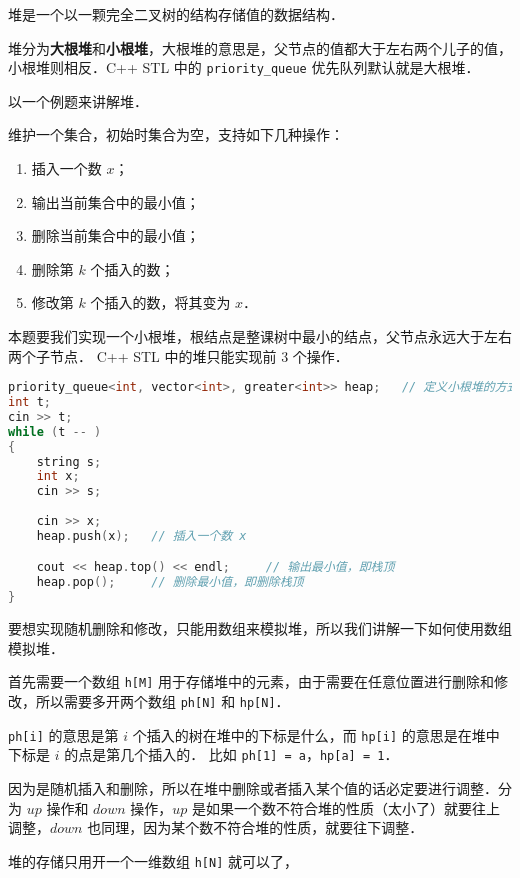 
堆是一个以一颗完全二叉树的结构存储值的数据结构．

堆分为\textbf{大根堆}和\textbf{小根堆}，大根堆的意思是，父节点的值都大于左右两个儿子的值，小根堆则相反．C++ STL 中的 \verb|priority_queue| 优先队列默认就是大根堆．

以一个例题来讲解堆．

维护一个集合，初始时集合为空，支持如下几种操作：
\begin{enumerate}
\item 插入一个数 $x$；
\item 输出当前集合中的最小值；
\item 删除当前集合中的最小值；
\item 删除第 $k$ 个插入的数；
\item 修改第 $k$ 个插入的数，将其变为 $x$．
\end{enumerate}

本题要我们实现一个小根堆，根结点是整课树中最小的结点，父节点永远大于左右两个子节点．
C++ STL 中的堆只能实现前 $3$ 个操作．
\begin{lstlisting}[language=cpp]
priority_queue<int, vector<int>, greater<int>> heap;   // 定义小根堆的方式
int t;
cin >> t;
while (t -- )
{
    string s;
    int x;
    cin >> s;
            
    cin >> x;
    heap.push(x);   // 插入一个数 x

    cout << heap.top() << endl;     // 输出最小值，即栈顶
    heap.pop();     // 删除最小值，即删除栈顶
}
\end{lstlisting}

要想实现随机删除和修改，只能用数组来模拟堆，所以我们讲解一下如何使用数组模拟堆．

首先需要一个数组 \verb|h[M]| 用于存储堆中的元素，由于需要在任意位置进行删除和修改，所以需要多开两个数组 \verb|ph[N]| 和 \verb|hp[N]|．

\verb|ph[i]| 的意思是第 $i$ 个插入的树在堆中的下标是什么，而 \verb|hp[i]| 的意思是在堆中下标是 $i$ 的点是第几个插入的．
比如 \verb|ph[1] = a|，\verb|hp[a] = 1|．

因为是随机插入和删除，所以在堆中删除或者插入某个值的话必定要进行调整．分为 $up$ 操作和 $down$ 操作，$up$ 是如果一个数不符合堆的性质（太小了）就要往上调整，$down$ 也同理，因为某个数不符合堆的性质，就要往下调整．

堆的存储只用开一个一维数组 \verb|h[N]| 就可以了，







